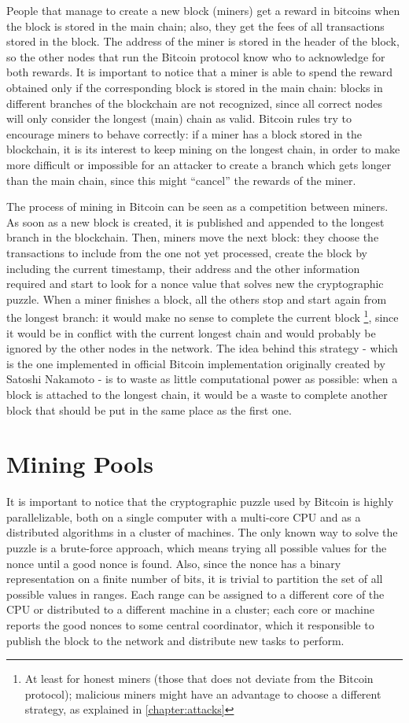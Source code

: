 \bigskip
People that manage to create a new block (miners) get a reward in bitcoins when the block is stored in the main chain;
also, they get the fees of all transactions stored in the block.
The address of the miner is stored in the header of the block, so the other nodes that run the Bitcoin protocol know who to acknowledge for both rewards.
It is important to notice that a miner is able to spend the reward obtained only if the corresponding block is stored in the main chain:
blocks in different branches of the blockchain are not recognized, since all correct nodes will only consider the longest (main) chain as valid.
Bitcoin rules try to encourage miners to behave correctly:
if a miner has a block stored in the blockchain, it is its interest to keep mining on the longest chain, in order to make more difficult or impossible for an attacker to create a branch which gets longer than the main chain, since this might ``cancel'' the rewards of the miner.

\bigskip
The process of mining in Bitcoin can be seen as a competition between miners.
As soon as a new block is created, it is published and appended to the longest branch in the blockchain.
Then, miners move the next block:
they choose the transactions to include from the one not yet processed, create the block by including the current timestamp, their address and the other information required and start to look for a nonce value that solves new the cryptographic puzzle.
When a miner finishes a block, all the others stop and start again from the longest branch:
it would make no sense to complete the current block \footnote{At least for honest miners (those that does not deviate from the Bitcoin protocol); malicious miners might have an advantage to choose a different strategy, as explained in \cref{chapter:attacks}}, since it would be in conflict with the current longest chain and would probably be ignored by the other nodes in the network.
The idea behind this strategy - which is the one implemented in official Bitcoin implementation originally created by Satoshi Nakamoto \cite{bitcoin_github} - is to waste as little computational power as possible:
when a block is attached to the longest chain, it would be a waste to complete another block that should be put in the same place as the first one.

\section{Mining Pools}
It is important to notice that the cryptographic puzzle used by Bitcoin is highly parallelizable, both on a single computer with a multi-core \ac{CPU} and as a distributed algorithms in a cluster of machines.
The only known way to solve the puzzle is a brute-force approach, which means trying all possible values for the nonce until a good nonce is found.
Also, since the nonce has a binary representation on a finite number of bits, it is trivial to partition the set of all possible values in ranges.
Each range can be assigned to a different core of the \ac{CPU} or distributed to a different machine in a cluster;
each core or machine reports the good nonces to some central coordinator, which it responsible to publish the block to the network and distribute new tasks to perform.

